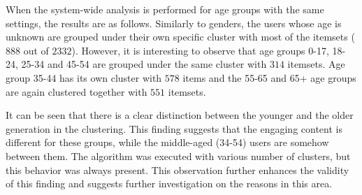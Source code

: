 When the system-wide analysis is performed for age groups with the same settings, the results are as follows. Similarly to genders, the users whose age is unknown are grouped under their own specific cluster with most of the itemsets ($888$ out of $2 332$). However, it is interesting to observe that age groups 0-17, 18-24, 25-34 and 45-54 are grouped under the same cluster with $314$ itemsets. Age group 35-44 has its own cluster with $578$ items and the 55-65 and 65+ age groups are again clustered together with $551$ itemsets. 

It can be seen that there is a clear distinction between the younger and the older generation in the clustering. This finding suggests that the engaging content is different for these groups, while the middle-aged (34-54) users are somehow between them. The algorithm was executed with various number of clusters, but this behavior was always present. This observation further enhances the validity of this finding and suggests further investigation on the reasons in this area.

